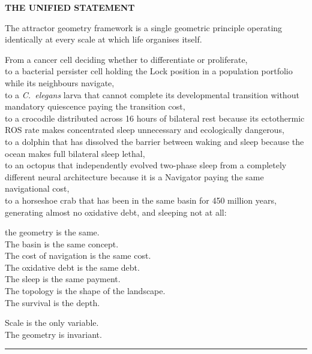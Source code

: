 \documentclass[10pt, a4paper]{article}
\begin{document}
\begin{mdframed}[
  backgroundcolor=claimbox,
  linecolor=claimbox,
  linewidth=0pt,
  innertopmargin=0.7em,
  innerbottommargin=0.7em,
  innerleftmargin=1.0em,
  innerrightmargin=1.0em
]
\color{white}
\textbf{THE UNIFIED STATEMENT}

\medskip
The attractor geometry framework is a
single geometric principle operating
identically at every scale at which
life organises itself.

\medskip
From a cancer cell deciding whether to
differentiate or proliferate,\\
to a bacterial persister cell holding
the Lock position in a population
portfolio while its neighbours navigate,\\
to a \textit{C.~elegans} larva that
cannot complete its developmental
transition without mandatory quiescence
paying the transition cost,\\
to a crocodile distributed across
16 hours of bilateral rest because
its ectothermic ROS rate makes
concentrated sleep unnecessary and
ecologically dangerous,\\
to a dolphin that has dissolved the
barrier between waking and sleep
because the ocean makes full bilateral
sleep lethal,\\
to an octopus that independently
evolved two-phase sleep from a
completely different neural architecture
because it is a Navigator paying the
same navigational cost,\\
to a horseshoe crab that has been
in the same basin for 450 million
years, generating almost no oxidative
debt, and sleeping not at all:

\medskip
the geometry is the same.\\
The basin is the same concept.\\
The cost of navigation is the same cost.\\
The oxidative debt is the same debt.\\
The sleep is the same payment.\\
The topology is the shape of
the landscape.\\
The survival is the depth.

\medskip
Scale is the only variable.\\
The geometry is invariant.
\end{mdframed}

\vspace{0.8em}
\noindent\textcolor{rulecolor}
{\rule{\linewidth}{0.6pt}}
\end{document}
